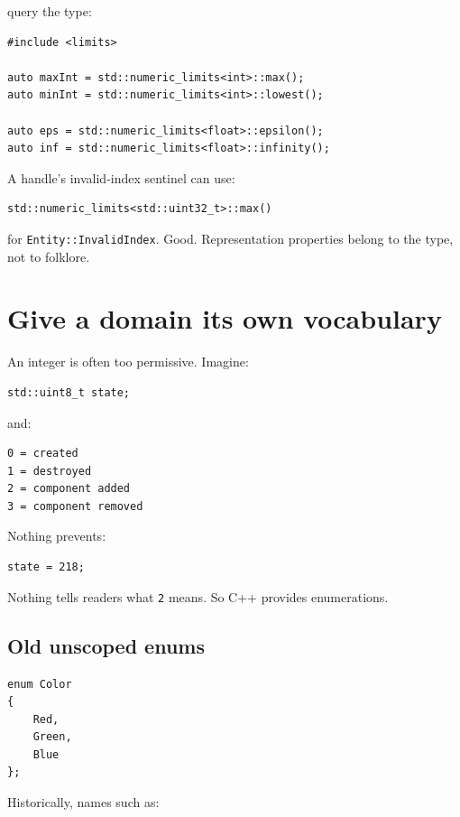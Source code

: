 query the type:

\begin{verbatim}
#include <limits>

auto maxInt = std::numeric_limits<int>::max();
auto minInt = std::numeric_limits<int>::lowest();

auto eps = std::numeric_limits<float>::epsilon();
auto inf = std::numeric_limits<float>::infinity();
\end{verbatim}

A handle's invalid-index sentinel can use:

\begin{verbatim}
std::numeric_limits<std::uint32_t>::max()
\end{verbatim}

for \texttt{Entity::InvalidIndex}. Good. Representation properties belong to the type, not to folklore.

\section{Give a domain its own vocabulary}\label{01-foundations-i-ch002-give-a-domain-its-own-vocabulary}

An integer is often too permissive. Imagine:

\begin{verbatim}
std::uint8_t state;
\end{verbatim}

and:

\begin{verbatim}
0 = created
1 = destroyed
2 = component added
3 = component removed
\end{verbatim}

Nothing prevents:

\begin{verbatim}
state = 218;
\end{verbatim}

Nothing tells readers what \texttt{2} means. So C++ provides enumerations.

\subsection{Old unscoped enums}\label{01-foundations-i-ch002-old-unscoped-enums}

\begin{verbatim}
enum Color
{
    Red,
    Green,
    Blue
};
\end{verbatim}

Historically, names such as:

